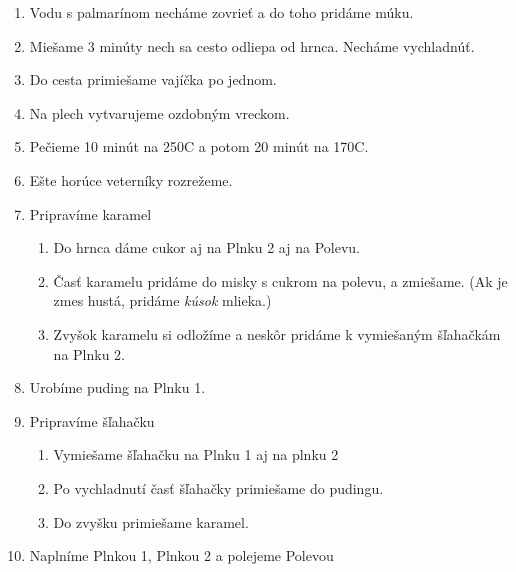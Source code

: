 \begin{recipe}

\begin{enumerate}

\item{Vodu s palmarínom necháme zovrieť a do toho pridáme múku.}
\item{Miešame 3 minúty nech sa cesto odliepa od hrnca. Necháme vychladnúť.}
\item{Do cesta primiešame vajíčka po jednom.}
\item{Na plech vytvarujeme ozdobným vreckom.}
\item{Pečieme 10 minút na 250C a potom 20 minút na 170C.}
\item{Ešte horúce veterníky rozrežeme.}

\item{Pripravíme karamel}
\begin{enumerate}
\item{Do hrnca dáme cukor aj na Plnku 2 aj na Polevu.}
\item{Časť karamelu pridáme do misky s cukrom na polevu, a zmiešame. (Ak je zmes hustá, pridáme \emph{kúsok} mlieka.)}
\item{Zvyšok karamelu si odložíme a neskôr pridáme k vymiešaným šľahačkám na Plnku 2.}
\end{enumerate}

\item{Urobíme puding na Plnku 1.}

\item{Pripravíme šľahačku}
\begin{enumerate}
\item{Vymiešame šľahačku na Plnku 1 aj na plnku 2}
\item{Po vychladnutí časť šľahačky primiešame do pudingu.}
\item{Do zvyšku primiešame karamel.}
\end{enumerate}

\item{Naplníme Plnkou 1, Plnkou 2 a polejeme Polevou}

\end{enumerate}
\end{recipe}

\begin{notes}

\end{notes}
\clearpage	